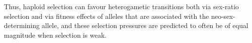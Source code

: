 \documentclass[12pt]{article}
\begin{document}
Thus, haploid selection can favour heterogametic transitions both via sex-ratio selection %
and via fitness effects of alleles that are associated with the neo-sex-determining allele, and these selection pressures are predicted to often be of equal magnitude when selection is weak. 


\end{document}
